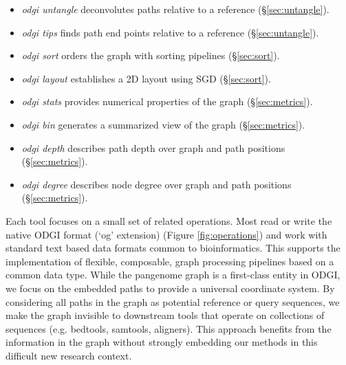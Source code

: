 \documentclass{bioinfo}
\begin{document}
\begin{itemize}
\item \textit{odgi untangle} deconvolutes paths relative to a reference (\S\ref{sec:untangle}).
\item \textit{odgi tips} finds path end points relative to a reference (\S\ref{sec:untangle}).
\item \textit{odgi sort} orders the graph with sorting pipelines (\S\ref{sec:sort}).
\item \textit{odgi layout} establishes a 2D layout using SGD (\S\ref{sec:sort}).
\item \textit{odgi stats} provides numerical properties of the graph (\S\ref{sec:metrics}).
\item \textit{odgi bin} generates a summarized view of the graph (\S\ref{sec:metrics}).
\item \textit{odgi depth} describes path depth over graph and path positions (\S\ref{sec:metrics}).
\item \textit{odgi degree} describes node degree over graph and path positions (\S\ref{sec:metrics}).
\end{itemize}

Each tool focuses on a small set of related operations.
Most read or write the native ODGI format (`og' extension) (Figure \ref{fig:operations}) and work with standard text based data formats common to bioinformatics.
This supports the implementation of flexible, composable, graph processing pipelines based on a common data type.
While the pangenome graph is a first-class entity in ODGI, we focus on the embedded paths to provide a universal coordinate system.
By considering all paths in the graph as potential reference or query sequences, we make the graph invisible to downstream tools that operate on collections of sequences (e.g. bedtools, samtools, aligners).
This approach benefits from the information in the graph without strongly embedding our methods in this difficult new research context.


\end{document}
